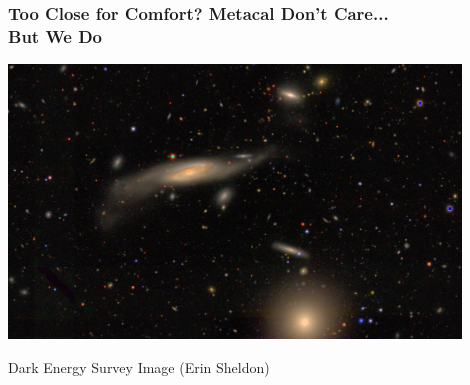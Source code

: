 \documentclass{beamer}
\begin{document}
\frame
{
    \frametitle{Too Close for Comfort?  Metacal Don't Care... \\But We Do}
 
    \begin{center}
        \includegraphics[width=0.9\textwidth]{DES0056-5248_gri_crop.jpg}
    \end{center}
    {\tiny Dark Energy Survey Image (Erin Sheldon)}

}
\end{document}

